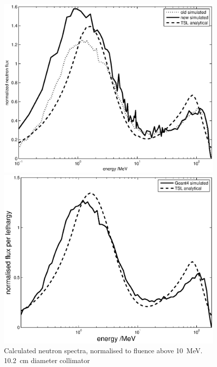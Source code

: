 \documentclass[11pt,a4paper]{IEEEtran}
\let\MYoriglatexcaption\caption
\renewcommand{\caption}[2][\relax]{\MYoriglatexcaption[#2]{#2}}
\begin{document}
\begin{figure}[t]
    \begin{minipage}{\columnwidth}
        \centering
        \includegraphics[width=0.9\columnwidth]{SUPNormalisedRADECS.eps}
    \end{minipage}
    \begin{minipage}{\columnwidth}
        \centering
        \includegraphics[width=0.9\columnwidth]{ANITALetYieldnormalisedRADECS.eps}
    \end{minipage}
	\caption{
        Calculated neutron spectra, normalised to fluence above \SI{10}{\MeV}.
        \SI{10.2}{\cm} diameter collimator
    }
	\label{fig:Lethargyplots}
\end{figure}
\end{document}
